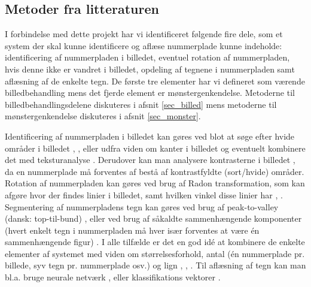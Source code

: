 \documentclass[11pt,a4paper,draft]{article}
\begin{document}
\subsection{Metoder fra litteraturen}


I forbindelse med dette projekt har vi identificeret følgende fire dele, som et system der skal kunne identificere og aflæse nummerplade kunne indeholde: identificering af nummerpladen i billedet, eventuel rotation af nummerpladen, hvis denne ikke er vandret i billedet, opdeling af tegnene i nummerpladen samt aflæsning af de enkelte tegn. De første tre elementer har vi defineret som værende billedbehandling mens det fjerde element er mønstergenkendelse. Metoderne til billedbehandlingsdelene diskuteres i afsnit \ref{sec_billed} mens metoderne til mønstergenkendelse diskuteres i afsnit \ref{sec_monster}.

Identificering af nummerpladen i billedet kan gøres ved blot at søge efter hvide områder i billedet \cite{ron}, \cite{nijhuis}, eller udfra viden om kanter i billedet \cite{shapiro} og eventuelt kombinere det med teksturanalyse \cite{parker}. Derudover kan man analysere kontrasterne i billedet \cite{kwas}, da en nummerplade må forventes af bestå af kontrastfyldte (sort/hvide) områder. Rotation af nummerpladen kan gøres ved brug af Radon transformation, som kan afgøre hvor der findes linier i billedet, samt hvilken vinkel disse linier har \cite{ron}, \cite{shapiro}. Segmentering af nummerpladens tegn kan gøres ved brug af peak-to-valley (dansk: top-til-bund) \cite{ron}, \cite{kwas} eller ved brug af såkaldte sammenhængende komponenter (hvert enkelt tegn i nummerpladen må hver især forventes at være én sammenhængende figur) \cite{nijhuis}. I alle tilfælde er det en god idé at kombinere de enkelte elementer af systemet med viden om størrelsesforhold, antal (én nummerplade pr. billede, syv tegn pr. nummerplade osv.) og lign \cite{nijhuis}, \cite{parker}, \cite{kwas}. Til aflæsning af tegn kan man bl.a. bruge neurale netværk \cite{nijhuis}, \cite{kwas} eller klassifikations vektorer \cite{arth}.



\end{document}
